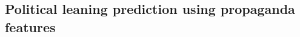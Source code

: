 












\subsection{\statusgreen Political leaning prediction using propaganda features}
\label{ssec:ps_prop_leaning_classifier}

